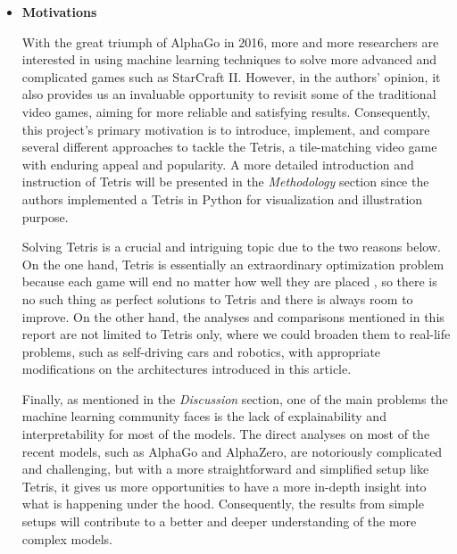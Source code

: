 \documentclass[letterpaper]{article} %
\begin{document}
%
\begin{itemize} 

\item 
{\bf Motivations}


With the great triumph of AlphaGo in 2016, more and more researchers are interested in using machine learning techniques to solve more advanced and complicated games such as StarCraft II. However, in the authors' opinion, it also provides us an invaluable opportunity to revisit some of the traditional video games, aiming for more reliable and satisfying results. Consequently, this project's primary motivation is to introduce, implement, and compare several different approaches to tackle the Tetris, a tile-matching video game with enduring appeal and popularity. A more detailed introduction and instruction of Tetris will be presented in the {\it Methodology} section since the authors implemented a Tetris in Python for visualization and illustration purpose.

Solving Tetris is a crucial and intriguing topic due to the two reasons below. On the one hand, Tetris is essentially an extraordinary optimization problem because each game will end no matter how well they are placed \cite{burgiel_1997}, so there is no such thing as perfect solutions to Tetris and there is always room to improve. On the other hand, the analyses and comparisons mentioned in this report are not limited to Tetris only, where we could broaden them to real-life problems, such as self-driving cars and robotics, {with appropriate modifications on the architectures introduced in this article}.

Finally, as mentioned in the {\it Discussion} section, one of the main problems the machine learning community faces is the lack of explainability and interpretability for most of the models. The direct analyses on most of the recent models, such as AlphaGo and AlphaZero, are notoriously complicated and challenging, but with a more straightforward and simplified setup like Tetris, it gives us more opportunities to have a more in-depth insight into what is happening under the hood. Consequently, the results from simple setups will contribute to a better and deeper understanding of the more complex models.


\end{itemize}
\end{document}
